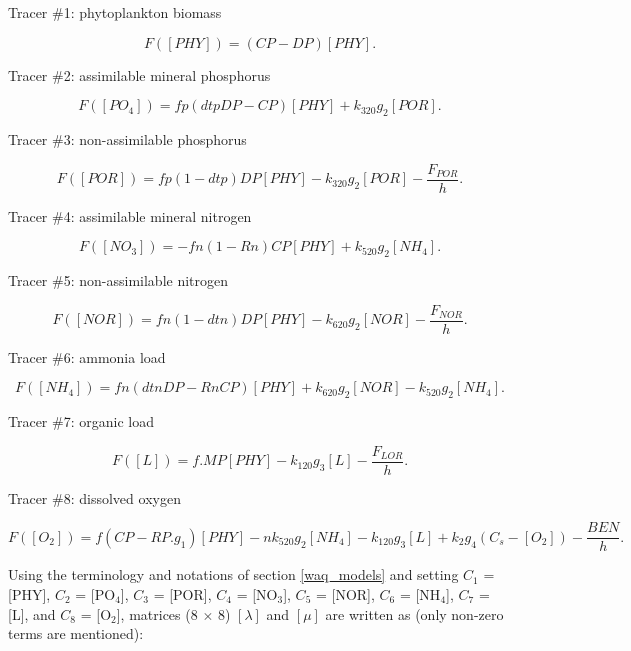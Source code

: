 Tracer $\#$1: phytoplankton biomass

\begin{equation}
  F([PHY]) = (CP-DP) [PHY].
\end{equation}

Tracer $\#$2: assimilable mineral phosphorus

\begin{equation}
  F([PO_4]) = fp(dtp DP - CP) [PHY] + k_{320} g_2 [POR].
\end{equation}

Tracer $\#$3: non-assimilable phosphorus

\begin{equation}
  F([POR]) = fp(1-dtp) DP [PHY] - k_{320} g_2 [POR] - \frac{F_{POR}}{h}.
\end{equation}

Tracer $\#$4: assimilable mineral nitrogen

\begin{equation}
  F([NO_3]) = - fn (1- Rn) CP [PHY] + k_{520} g_2 [NH_4].
\end{equation}

Tracer $\#$5: non-assimilable nitrogen

\begin{equation}
  F([NOR]) = fn (1- dtn) DP [PHY] - k_{620} g_2 [NOR] - \frac{F_{NOR}}{h}.
\end{equation}

Tracer $\#$6: ammonia load

\begin{equation}
  F([NH_4]) = fn (dtn DP - Rn CP) [PHY] + k_{620} g_2 [NOR] - k_{520} g_2 [NH_4].
\end{equation}

Tracer $\#$7: organic load

\begin{equation}
  F([L]) = f.MP [PHY] - k_{120} g_3 [L] - \frac{F_{LOR}}{h}.
\end{equation}

Tracer $\#$8: dissolved oxygen

\begin{equation}
  F([O_2]) = f (CP - RP.g_1) [PHY] - n k_{520} g_2 [NH_4] - k_{120} g_3 [L] + k_2 g_4 (C_s - [O_2]) - \frac{BEN}{h}.
\end{equation}

Using the terminology and notations of section \ref{waq_models} and setting
$C_1$ = [PHY], $C_2$  = [PO$_4$], $C_3$ = [POR], $C_4$ = [NO$_3$], $C_5$ = [NOR],
$C_6$ = [NH$_4$], $C_7$ = [L], and $C_8$ = [O$_2$],
matrices (8 $\times$ 8) $[\lambda]$ and $[\mu]$
are written as (only non-zero terms are mentioned):\\


